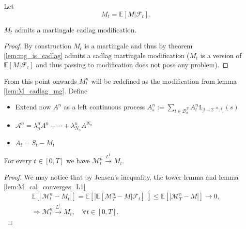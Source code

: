 Let \begin{equation}\label{equation_DM_e6} M_t = \mathbb{E}[M\vert\mathcal{F}_t].\end{equation}

\begin{lemma}\label{lem:M_cadlag_mg}
  $M_t$ admits a martingale cadlag modification.
\end{lemma}
\begin{proof}
  By construction $M_t$ is a martingale and thus by theorem \ref{lem:mg_is_cadlag} admits a cadlag martingale modification
  ($M_t$ is a version of $\mathbb{E}[M\vert\mathcal{F}_t]$ and thus passing to modification does not pose any problem).
\end{proof}

From this point onwards $M^n_t$ will be redefined as the modification from lemma \ref{lem:M_cadlag_mg}.
Define
\begin{itemize}
  \item Extend now $A^n$ as a left continuous process $A^n_s:=\sum_{t\in\mathcal{D}^T_n}A^n_t\mathbb{1}_{]t-2^{-n},t]}(s)$
  \item $\mathcal{A}^n=\lambda^n_nA^n+\cdots +\lambda^n_{N_n}A^{N_n}$
  \item $A_t=S_t-M_t$
\end{itemize}

\begin{lemma}\label{lem:M1_komlos}
  For every $t\in[0,T]$ we have $\mathcal{M}^n_t\stackrel{L^1}{\rightarrow}M_t$.
\end{lemma}
\begin{proof}
  We may notice that by Jensen's inequality, the tower lemma and lemma \ref{lem:M_cal_converges_L1}
  \begin{gather}\nonumber
    \mathbb{E}[|\mathcal{M}^n_t-M_t|]=\mathbb{E}[|\mathbb{E}[\mathcal{M}^n_T-M\vert\mathcal{F}_t]|]\leq \mathbb{E}[|\mathcal{M}^n_T-M|]\rightarrow0,\\
    \Rightarrow\mathcal{M}^n_t\stackrel{L^1}{\rightarrow} M_t,\quad \forall t\in[0,T].\label{equation_DM_e7}
  \end{gather}
\end{proof}

